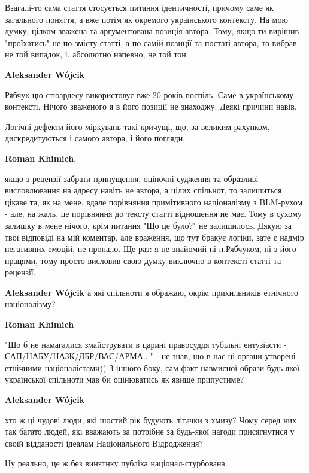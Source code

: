 \begin{itemize}
\begin{itemize}

Взагалі-то сама стаття стосується питання ідентичності, причому саме як
загального поняття, а вже потім як окремого українського контексту. На мою
думку, цілком зважена та аргументована позиція автора. Тому, якщо ти вирішив
"проїхатись" не по змісту статті, а по самій позиції та постаті автора, то
вибрав не той випадок, і, абсолютно напевно, не той тон.

\textbf{Aleksander Wójcik} 

Рябчук цю стюардесу використовує вже 20 років поспіль. Саме в українському
контексті. Нічого зваженого я в його позиції не знаходжу. Деякі причини навів.

Логічні дефекти його міркувань такі кричущі, що, за великим рахунком,
дискредитуються і самого автора, і його погляди.


\textbf{Roman Khimich}, 

якщо з рецензії забрати припущення, оціночні судження та образливі
висловлювання на адресу навіть не автора, а цілих спільнот, то залишиться
цікаве та, як на мене, вдале порівняння примітивного націоналізму з BLM-рухом -
але, на жаль, це порівняння до тексту статті відношення не має. Тому в сухому
залишку в мене нічого, крім питання "Що це було?" не залишилось. Дякую за твої
відповіді на мій коментар, але враження, що тут бракує логіки, зате є надмір
негативних емоцій, не пропало. Ще раз: я не знайомий ні п.Рябчуком, ні з його
працями, тому просто висловив свою думку виключно в контексті статті та
рецензії.

\textbf{Aleksander Wójcik} а які спільноти я ображаю, окрім прихильників етнічного націоналізму?

\textbf{Roman Khimich} 

"Що б не намагалися змайструвати в царині правосуддя тубільні ентузіасти -
САП/НАБУ/НАЗК/ДБР/ВАС/АРМА..." - не знав, що в нас ці органи утворені етнічними
націоналістами)) З іншого боку, сам факт навмисної образи будь-якої української
спільноти мав би оцінюватись як явище припустиме?


\textbf{Aleksander Wójcik} 

хто ж ці чудові люди, які шостий рік будують літачки з хмизу? Чому серед них
так багато людей, які вважають за потрібне за будь-якої нагоди присягнутися у
своїй відданості ідеалам Національного Відродження?

Ну реально, це ж без винятнку публіка націонал-стурбована.


\end{itemize}
\end{itemize}
